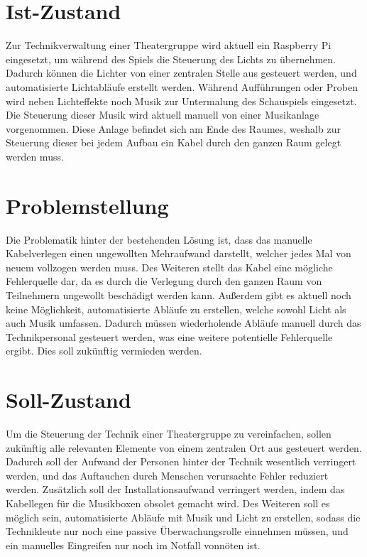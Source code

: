 

\section{Ist-Zustand}
Zur Technikverwaltung einer Theatergruppe wird aktuell ein Raspberry
Pi eingesetzt, um während des Spiels die Steuerung des Lichts zu übernehmen. Dadurch
können die Lichter von einer zentralen Stelle aus gesteuert werden,
und automatisierte Lichtabläufe erstellt werden. Während Aufführungen oder
Proben wird neben Lichteffekte noch Musik zur Untermalung des
Schauspiels eingesetzt. Die Steuerung dieser Musik wird aktuell manuell von
einer Musikanlage vorgenommen. Diese Anlage befindet sich am Ende des
Raumes, weshalb zur Steuerung dieser bei jedem Aufbau ein Kabel durch den ganzen
Raum gelegt werden muss.

\section{Problemstellung}
Die Problematik hinter der bestehenden Lösung ist, dass das manuelle Kabelverlegen
einen ungewollten Mehraufwand darstellt, welcher jedes Mal von neuem
vollzogen werden muss. Des Weiteren stellt das Kabel eine mögliche
Fehlerquelle dar, da es durch die Verlegung durch den ganzen Raum von
Teilnehmern ungewollt beschädigt werden kann.
Außerdem gibt es aktuell noch keine Möglichkeit, automatisierte
Abläufe zu erstellen, welche sowohl Licht als auch Musik umfassen. Dadurch
müssen wiederholende Abläufe manuell durch das Technikpersonal gesteuert
werden, was eine weitere potentielle Fehlerquelle ergibt. Dies soll zukünftig
vermieden werden.


\section{Soll-Zustand}
Um die Steuerung der Technik einer Theatergruppe zu vereinfachen, sollen
zukünftig alle relevanten Elemente von einem zentralen Ort aus gesteuert
werden. Dadurch soll der Aufwand der Personen hinter der Technik wesentlich
verringert werden, und das Auftauchen durch Menschen verursachte Fehler
reduziert werden. Zusätzlich soll der Installationsaufwand verringert werden,
indem das Kabellegen für die Musikboxen obsolet gemacht wird.  Des Weiteren
soll es möglich sein, automatisierte Abläufe mit Musik und Licht zu erstellen,
sodass die Technikleute nur noch eine passive Überwachungsrolle einnehmen
müssen, und ein manuelles Eingreifen nur noch im Notfall vonnöten ist. 


